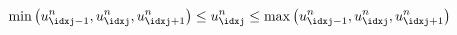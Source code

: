 \begin{principbox}\nospacing
    \begin{princip}
        \label{princip:discrete_maximum_principle}
        \begin{align}
          \min \left(u_{\idxj-1}^{n},u_{\idxj}^{n},u_{\idxj+1}^{n}\right)
          \leq u_{\idxj}^{n}\leq\max\left(u_{\idxj-1}^{n},u_{\idxj}^{n},u_{\idxj+1}^{n}\right)
        \end{align}
        \begin{figure}[H]
            \centering{
              \def\svgwidth{120pt}
              \resizebox{0.6\linewidth}{!}{}
            }
        \end{figure}
    \end{princip}
\end{principbox}
